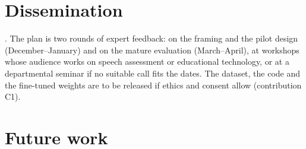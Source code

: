 \section{Dissemination}\label{sec:concl-dissemination}

. The plan is two rounds of expert feedback:
on the framing and the pilot design (December--January) and on the mature evaluation (March--April), at
workshops whose audience works on speech assessment or educational technology, or at a departmental seminar if
no suitable call fits the dates. The dataset, the code and the fine-tuned weights are to be released if ethics
and consent allow (contribution C1).

\section{Future work}


